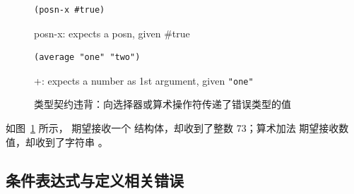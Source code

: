 \begin{figure}[htbp]
  \centering
\begin{stepperbox}[unbreakable]
\noindent\begin{minipage}[c]{0.46\linewidth}
\begin{Verbatim}[commandchars=\\\{\}, fontsize=\footnotesize]
(posn-x #true)
\end{Verbatim}
\end{minipage}\hfill
\begin{minipage}[c]{0.50\linewidth}\footnotesize\sffamily\raggedright
posn-x: expects a posn, given \#true
\end{minipage}
\end{stepperbox}
\begin{stepperbox}[unbreakable]
\noindent\begin{minipage}[c]{0.46\linewidth}
\begin{Verbatim}[commandchars=\\\{\}, fontsize=\footnotesize]
(average "one" "two")
\end{Verbatim}
\end{minipage}\hfill
\begin{minipage}[c]{0.50\linewidth}\footnotesize\sffamily\raggedright
+: expects a number as 1st argument, given \texttt{"one"}
\end{minipage}
\end{stepperbox}
  \caption{类型契约违背：向选择器或算术操作符传递了错误类型的值}
  \label{fig:err_type_contract}
\end{figure}

如图~\ref{fig:err_type_contract} 所示， 期望接收一个  结构体，却收到了整数 73；算术加法 \code{+} 期望接收数值，却收到了字符串 。

\subsection{条件表达式与定义相关错误}


